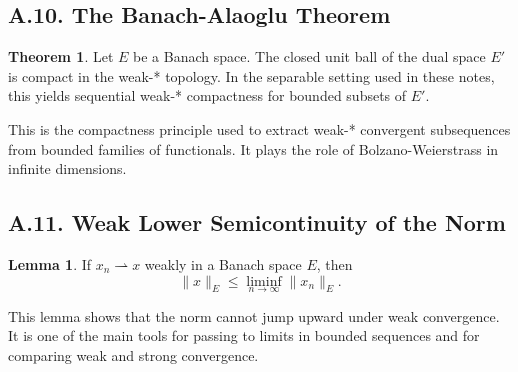\documentclass[11pt]{article}
\theoremstyle{definition}
\newtheorem{theorem}{Theorem}
\newtheorem{lemma}{Lemma}
\theoremstyle{remark}
\begin{document}
\subsection*{A.10. The Banach-Alaoglu Theorem}
\begin{theorem}
Let \(E\) be a Banach space. The closed unit ball of the dual space \(E'\) is compact in the weak-* topology. In the separable setting used in these notes, this yields sequential weak-* compactness for bounded subsets of \(E'\).
\end{theorem}
This is the compactness principle used to extract weak-* convergent subsequences from bounded families of functionals. It plays the role of Bolzano-Weierstrass in infinite dimensions.

\subsection*{A.11. Weak Lower Semicontinuity of the Norm}
\begin{lemma}
If \(x_n\rightharpoonup x\) weakly in a Banach space \(E\), then
\[
\|x\|_E\le \liminf_{n\to\infty}\|x_n\|_E.
\]
\end{lemma}
This lemma shows that the norm cannot jump upward under weak convergence. It is one of the main tools for passing to limits in bounded sequences and for comparing weak and strong convergence.
\end{document}
